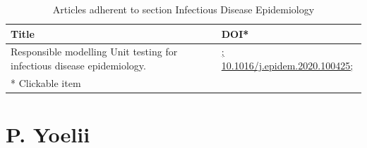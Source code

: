\documentclass{qqtarticle}
\begin{document}
        \begin{table}[H]
        \scriptsize
        \centering
        \caption{Articles adherent to section Infectious Disease Epidemiology}
        \renewcommand{\arraystretch}{1.5}
        \begin{tabular}{p{}l}
            \toprule 
            Title & DOI* \\     \midrule Responsible modelling  Unit testing for infectious disease epidemiology. \cite{Responsibl7050b63e} & \href{https://dx.doi.org/; 10.1016/j.epidem.2020.100425; }{; 10.1016/j.epidem.2020.100425; }\\     \midrule
            * Clickable item \\
            \bottomrule
        \end{tabular}
        \label{tab:topic7}
        \end{table}\section{P. Yoelii}
\end{document}

